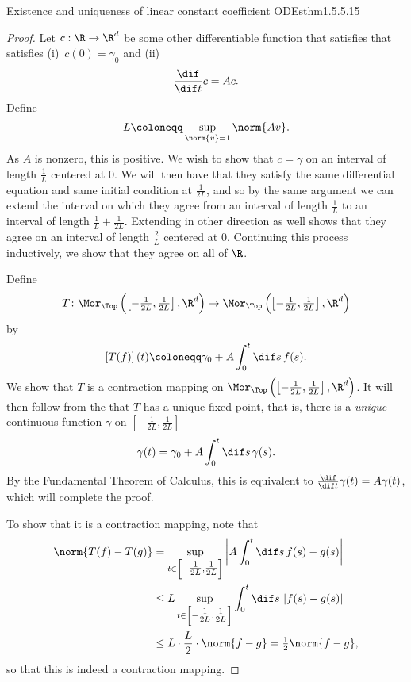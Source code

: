 \begin{thm}{Existence and uniqueness of linear constant coefficient ODEs}{thm1.5.5.15}
\begin{proof}
Let $c:\R \rightarrow \R ^d$ be some other differentiable function that satisfies that satisfies (i)~$c(0)=\gamma _0$ and (ii)
\begin{equation}
\frac{\dif}{\dif t}c=Ac.
\end{equation}
Define
\begin{equation}
L\coloneqq \sup _{\norm{v}=1}\norm{Av}.
\end{equation}
As $A$ is nonzero, this is positive.  We wish to show that $c=\gamma$ on an interval of length $\frac{1}{L}$ centered at $0$.  We will then have that they satisfy the same differential equation and same initial condition at $\frac{1}{2L}$, and so by the same argument we can extend the interval on which they agree from an interval of length $\frac{1}{L}$ to an interval of length $\frac{1}{L}+\frac{1}{2L}$.  Extending in other direction as well shows that they agree on an interval of length $\frac{2}{L}$ centered at $0$.  Continuing this process inductively, we show that they agree on all of $\R$.

Define
\begin{equation*}
T\colon \Mor _{\Top}\left( \left[ -\tfrac{1}{2L},\tfrac{1}{2L}\right] ,\R ^d\right) \rightarrow \Mor _{\Top}\left( \left[ -\tfrac{1}{2L},\tfrac{1}{2L}\right] ,\R ^d\right)
\end{equation*}
by
\begin{equation}
\left[ T(f)\right] (t)\coloneqq \gamma _0+A\int _0^t\dif s\, f(s).
\end{equation}
We show that $T$ is a contraction mapping on $\Mor _{\Top}\left( \left[ -\frac{1}{2L},\frac{1}{2L}\right] ,\R ^d\right)$.  It will then follow from the  that $T$ has a unique fixed point, that is, there is a \emph{unique} continuous function $\gamma$ on $\left[ -\frac{1}{2L},\frac{1}{2L}\right]$
\begin{equation}
\gamma (t)=\gamma _0+A\int _0^t\dif s\, \gamma (s).
\end{equation}
By the Fundamental Theorem of Calculus, this is equivalent to $\frac{\dif}{\dif t}\gamma (t)=A\gamma (t)$, which will complete the proof.

To show that it is a contraction mapping, note that
\begin{equation*}
\begin{split}
\norm{T(f)-T(g)} & =\sup _{t\in \left[ -\tfrac{1}{2L},\tfrac{1}{2L}\right]}\left| A\int _0^t\dif s\, f(s)-g(s)\right| \\
& \leq L\sup _{t\in \left[ -\tfrac{1}{2L},\tfrac{1}{2L}\right]}\int _0^t\dif s\, \left| f(s)-g(s)\right| \\
& \leq L\cdot \frac{L}{2}\cdot \norm{f-g}=\tfrac{1}{2}\norm{f-g},
\end{split}
\end{equation*}
so that this is indeed a contraction mapping.
\end{proof}
\end{thm}
